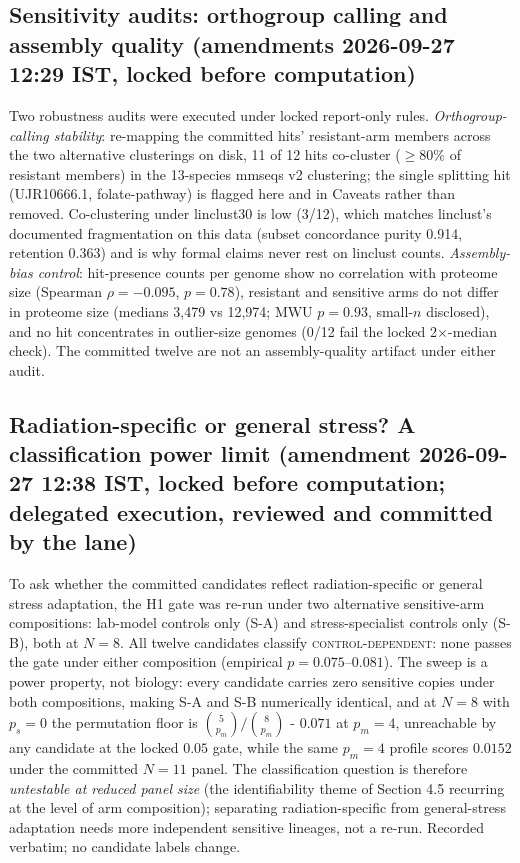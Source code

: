 \documentclass[12pt,a4paper]{article}
\begin{document}
\subsection{Sensitivity audits: orthogroup calling and assembly quality (amendments 2026-09-27 12:29 IST, locked before computation)}
Two robustness audits were executed under locked report-only rules. \emph{Orthogroup-calling stability}: re-mapping the committed hits' resistant-arm members across the two alternative clusterings on disk, 11 of 12 hits co-cluster ($\ge 80\%$ of resistant members) in the 13-species mmseqs v2 clustering; the single splitting hit (UJR10666.1, folate-pathway) is flagged here and in Caveats rather than removed. Co-clustering under linclust30 is low (3/12), which matches linclust's documented fragmentation on this data (subset concordance purity 0.914, retention 0.363) and is why formal claims never rest on linclust counts. \emph{Assembly-bias control}: hit-presence counts per genome show no correlation with proteome size (Spearman $\rho = -0.095$, $p = 0.78$), resistant and sensitive arms do not differ in proteome size (medians 3{,}479 vs 12{,}974; MWU $p = 0.93$, small-$n$ disclosed), and no hit concentrates in outlier-size genomes (0/12 fail the locked 2$\times$-median check). The committed twelve are not an assembly-quality artifact under either audit.

\subsection{Radiation-specific or general stress? A classification power limit (amendment 2026-09-27 12:38 IST, locked before computation; delegated execution, reviewed and committed by the lane)}
To ask whether the committed candidates reflect radiation-specific or general stress adaptation, the H1 gate was re-run under two alternative sensitive-arm compositions: lab-model controls only (S-A) and stress-specialist controls only (S-B), both at $N = 8$. All twelve candidates classify \textsc{control-dependent}: none passes the gate under either composition (empirical $p = 0.075$--$0.081$). The sweep is a power property, not biology: every candidate carries zero sensitive copies under both compositions, making S-A and S-B numerically identical, and at $N = 8$ with $p_s = 0$ the permutation floor is $\binom{5}{p_m}/\binom{8}{p_m}$ - $0.071$ at $p_m = 4$, unreachable by any candidate at the locked $0.05$ gate, while the same $p_m = 4$ profile scores $0.0152$ under the committed $N = 11$ panel. The classification question is therefore \emph{untestable at reduced panel size} (the identifiability theme of Section 4.5 recurring at the level of arm composition); separating radiation-specific from general-stress adaptation needs more independent sensitive lineages, not a re-run. Recorded verbatim; no candidate labels change.
\end{document}

